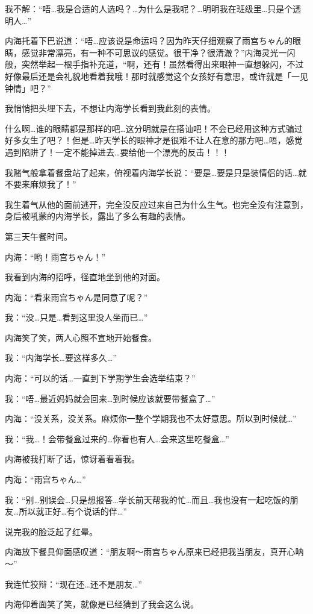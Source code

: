我不解：“唔…我是合适的人选吗？…为什么是我呢？…明明我在班级里…只是个透明人…”

内海托着下巴说道：“唔…应该说是命运吗？因为昨天仔细观察了雨宫ちゃん的眼睛，感觉非常漂亮，有一种不可思议的感觉。很干净？很清澈？”内海灵光一闪般，突然举起一根手指补充道，“啊，还有！虽然看得出来眼神一直想躲闪，不过好像最后还是会礼貌地看着我哦！那时就感觉这个女孩好有意思，或许就是「一见钟情」吧？”

我悄悄把头埋下去，不想让内海学长看到我此刻的表情。

什么啊…谁的眼睛都是那样的吧…这分明就是在搭讪吧！不会已经用这种方式骗过好多女生了吧？！但是…昨天学长的眼神才是很难不让人在意的那方吧…唔，感觉遇到陷阱了！一定不能掉进去…要给他一个漂亮的反击！！！

我赌气般拿着餐盘站了起来，俯视着内海学长说：“要是…要是只是装情侣的话…就不要来麻烦我了！”

我生着气从他的面前逃开，完全没反应过来自己为什么生气。也完全没有注意到，身后被吼蒙的内海学长，露出了多么有趣的表情。

\cutlinef\timepast

第三天午餐时间。

内海：“哟！雨宫ちゃん！”

我看到内海的招呼，径直地坐到他的对面。

内海：“看来雨宫ちゃん是同意了呢？”

我：“没…只是…看到这里没人坐而已…”

内海笑了笑，两人心照不宣地开始餐食。

我：“内海学长…要这样多久…”

内海：“可以的话…一直到下学期学生会选举结束？”

我：“唔…最近妈妈就会回来…到时候应该就要带餐盒了…”

内海：“没关系，没关系。麻烦你一整个学期我也不太好意思。所以到时候就…”

我：“我…！会带餐盒过来的…你看也有人…会来这里吃餐盒…”

内海被我打断了话，惊讶着看着我。

内海：“雨宫ちゃん…”

我：“别…别误会…只是想报答…学长前天帮我的忙…而且…我也没有一起吃饭的朋友…所以就正好…有个说话的伴…”

说完我的脸泛起了红晕。

内海放下餐具仰面感叹道：“朋友啊～雨宫ちゃん原来已经把我当朋友，真开心呐～”

我连忙狡辩：“现在还…还不是朋友…”

内海仰着面笑了笑，就像是已经猜到了我会这么说。

